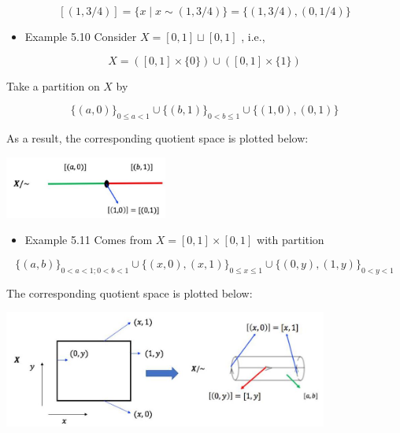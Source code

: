 \[
\left\lbrack  \left( {1,3/4}\right) \right\rbrack   = \{ x \mid  x \sim  \left( {1,3/4}\right) \}  = \{ \left( {1,3/4}\right) ,\left( {0,1/4}\right) \}
\]

\begin{itemize}
\item Example 5.10 Consider \(X = \left\lbrack  {0,1}\right\rbrack   \sqcup  \left\lbrack  {0,1}\right\rbrack\) , i.e.,
\end{itemize}

\[
X = \left( {\left\lbrack  {0,1}\right\rbrack  \times \{ 0\} }\right)  \cup  \left( {\left\lbrack  {0,1}\right\rbrack  \times \{ 1\} }\right)
\]

Take a partition on \(X\) by

\[
\{ \left( {a,0}\right) {\} }_{0 \leq  a < 1} \cup  \{ \left( {b,1}\right) {\} }_{0 < b \leq  1} \cup  \{ \left( {1,0}\right) ,\left( {0,1}\right) \}
\]

As a result, the corresponding quotient space is plotted below:

\begin{center}
\includegraphics[max width=0.4\textwidth]{images/bo_d2bcsrref24c73avs720_63_632_857_565_216_0.jpg}
\end{center}
\hspace*{3em} 

\begin{itemize}
\item Example 5.11 Comes from \(X = \left\lbrack  {0,1}\right\rbrack   \times  \left\lbrack  {0,1}\right\rbrack\) with partition
\end{itemize}

\[
\{ \left( {a,b}\right) {\} }_{0 < a < 1;0 < b < 1} \cup  \{ \left( {x,0}\right) ,\left( {x,1}\right) {\} }_{0 \leq  x \leq  1} \cup  \{ \left( {0,y}\right) ,\left( {1,y}\right) {\} }_{0 < y < 1}
\]

The corresponding quotient space is plotted below:
\begin{center}
\includegraphics[max width=0.8\textwidth]{images/bo_d2bcsrref24c73avs720_63_491_1596_949_343_0.jpg}
\end{center}
\hspace*{3em} 

